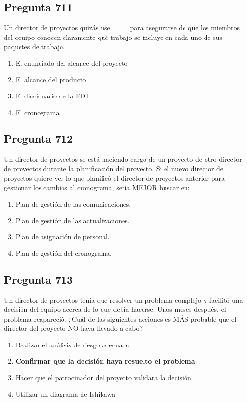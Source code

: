 \documentclass[11pt,a4paper]{article}
\begin{document}
\subsection*{Pregunta 711}
Un director de proyectos quizás use \_\_\_ para asegurarse de que los miembros del equipo conocen claramente qué trabajo se incluye en cada uno de sus paquetes de trabajo.

\begin{enumerate}[label=\alph*)]
  \item El enunciado del alcance del proyecto
  \item El alcance del producto
  \item El diccionario de la EDT
  \item El cronograma
\end{enumerate}

\subsection*{Pregunta 712}
Un director de proyectos se está haciendo cargo de un proyecto de otro director de proyectos durante la planificación del proyecto. Si el nuevo director de proyectos quiere ver lo que planificó el director de proyectos anterior para gestionar los cambios al cronograma, sería MEJOR buscar en:

\begin{enumerate}[label=\alph*)]
  \item Plan de gestión de las comunicaciones.
  \item Plan de gestión de las actualizaciones.
  \item Plan de asignación de personal.
  \item Plan de gestión del cronograma.
\end{enumerate}

\subsection*{Pregunta 713}
Un director de proyectos tenía que resolver un problema complejo y facilitó una decisión del equipo acerca de lo que debía hacerse. Unos meses después, el problema reapareció. ¿Cuál de las siguientes acciones es MÁS probable que el director del proyecto NO haya llevado a cabo?

\begin{enumerate}[label=\alph*)]
  \item Realizar el análisis de riesgo adecuado
  \item \textbf{Confirmar que la decisión haya resuelto el problema}
  \item Hacer que el patrocinador del proyecto validara la decisión
  \item Utilizar un diagrama de Ishikawa
\end{enumerate}
\end{document}

